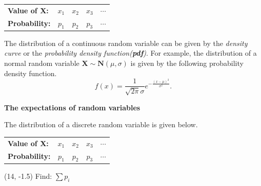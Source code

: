 \documentclass[a4paper, 12pt,twoside]{book}
\begin{document}
\begin{enumerate}[(1)]
     \begin{table}[H]
     \centering
         \begin{tabular}{lcccc}
         \hline
         \textbf{Value of X:} &\hspace{0.2cm}$x_1$&\hspace{0.2cm}$x_2$
         &\hspace{0.2cm}$x_3$&$\cdots$\\
         
                  \textbf{Probability:} &\hspace{0.2cm}$p_1$&\hspace{0.2cm}$p_2$
         &\hspace{0.2cm}$p_3$&$\cdots$\\
         \hline
         \end{tabular}
     \end{table}
     
 \noindent The distribution of a continuous random variable can be given by the \textit{density curve} or the \textit{probability density function(\textbf{pdf})}. For example, the distribution of a normal random variable $\textbf{X} \sim \textbf{N}(\mu, \sigma) $ is given by the following probability density function.
 $$f(x) = \frac{1}{\sqrt{2\pi}\sigma}e^{-\frac{(x-\mu)^2}{\sigma^2}}.$$
\end{enumerate}
\newpage

\noindent \textbf{The expectations of random variables}
\vspace{0.3cm}

The distribution of a discrete random variable is given below.
     \begin{table}[H]
     \centering
         \begin{tabular}{lcccc}
         \hline
         \textbf{Value of X:} &\hspace{0.2cm}$x_1$&\hspace{0.2cm}$x_2$
         &\hspace{0.2cm}$x_3$&$\cdots$\\
         
                  \textbf{Probability:} &\hspace{0.2cm}$p_1$&\hspace{0.2cm}$p_2$
         &\hspace{0.2cm}$p_3$&$\cdots$\\
         \hline
         \end{tabular}
     \end{table}
\begin{textblock}{3.6}(14, -1.5)
Find:  $\sum p_i$
\end{textblock}
\end{document}
